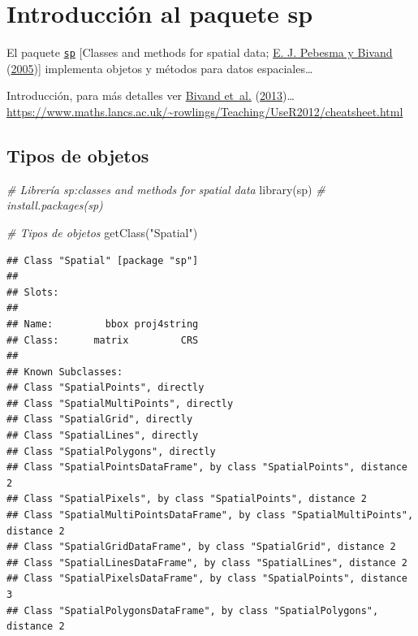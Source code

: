 \documentclass[
  spanish,
]{book}
\newenvironment{Shaded}{\begin{snugshade}}{\end{snugshade}}
\newcommand{\CommentTok}[1]{\textcolor[rgb]{0.56,0.35,0.01}{\textit{#1}}}
\newcommand{\FunctionTok}[1]{\textcolor[rgb]{0.00,0.00,0.00}{#1}}
\newcommand{\NormalTok}[1]{#1}
\newcommand{\StringTok}[1]{\textcolor[rgb]{0.31,0.60,0.02}{#1}}
\theoremstyle{break}
\begin{document}
\hypertarget{appendix-apendices}{%
\appendix}


\hypertarget{intro-sp}{%
\chapter{\texorpdfstring{Introducción al paquete \textbf{sp}}{Introducción al paquete sp}}\label{intro-sp}}

El paquete \href{https://CRAN.R-project.org/package=sp}{\texttt{sp}} {[}Classes and methods for spatial data; \protect\hyperlink{ref-Pebesma2005}{E. J. Pebesma y Bivand} (\protect\hyperlink{ref-Pebesma2005}{2005}){]} implementa objetos y métodos para datos espaciales\ldots{}

Introducción, para más detalles ver \protect\hyperlink{ref-Bivand2013}{Bivand et~al.} (\protect\hyperlink{ref-Bivand2013}{2013})\ldots{}
\url{https://www.maths.lancs.ac.uk/~rowlings/Teaching/UseR2012/cheatsheet.html}

\hypertarget{tipos-de-objetos}{%
\section{Tipos de objetos}\label{tipos-de-objetos}}

\begin{Shaded}
\begin{Highlighting}[]
\CommentTok{\# Librería sp:classes and methods for spatial data}
\FunctionTok{library}\NormalTok{(sp) }\CommentTok{\# install.packages(\textquotesingle{}sp\textquotesingle{})}

\CommentTok{\# Tipos de objetos}
\FunctionTok{getClass}\NormalTok{(}\StringTok{"Spatial"}\NormalTok{)}
\end{Highlighting}
\end{Shaded}

\begin{verbatim}
## Class "Spatial" [package "sp"]
## 
## Slots:
##                               
## Name:         bbox proj4string
## Class:      matrix         CRS
## 
## Known Subclasses: 
## Class "SpatialPoints", directly
## Class "SpatialMultiPoints", directly
## Class "SpatialGrid", directly
## Class "SpatialLines", directly
## Class "SpatialPolygons", directly
## Class "SpatialPointsDataFrame", by class "SpatialPoints", distance 2
## Class "SpatialPixels", by class "SpatialPoints", distance 2
## Class "SpatialMultiPointsDataFrame", by class "SpatialMultiPoints", distance 2
## Class "SpatialGridDataFrame", by class "SpatialGrid", distance 2
## Class "SpatialLinesDataFrame", by class "SpatialLines", distance 2
## Class "SpatialPixelsDataFrame", by class "SpatialPoints", distance 3
## Class "SpatialPolygonsDataFrame", by class "SpatialPolygons", distance 2
\end{verbatim}
\end{document}
